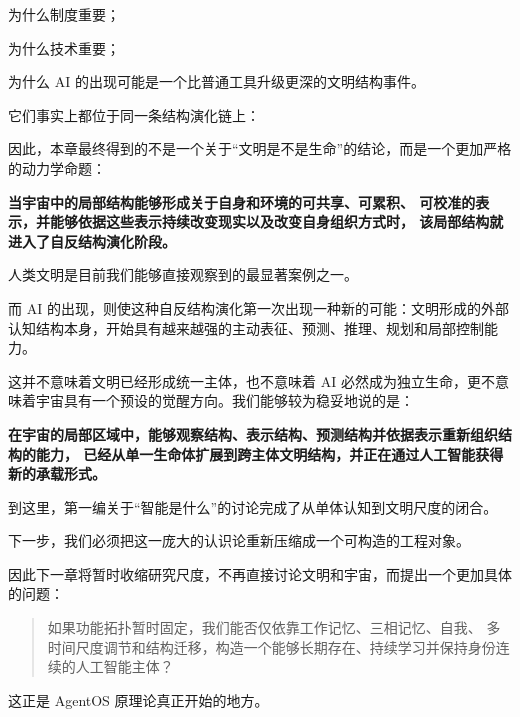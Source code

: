 为什么制度重要；

为什么技术重要；

为什么 AI 的出现可能是一个比普通工具升级更深的文明结构事件。

它们事实上都位于同一条结构演化链上：

\begin{statementbox}
\centering
{}
\end{statementbox}

因此，本章最终得到的不是一个关于“文明是不是生命”的结论，而是一个更加严格的动力学命题：

\begin{proposition*}
\bfseries
当宇宙中的局部结构能够形成关于自身和环境的可共享、可累积、
可校准的表示，并能够依据这些表示持续改变现实以及改变自身组织方式时，
该局部结构就进入了自反结构演化阶段。
\end{proposition*}

人类文明是目前我们能够直接观察到的最显著案例之一。

而 AI 的出现，则使这种自反结构演化第一次出现一种新的可能：文明形成的外部认知结构本身，开始具有越来越强的主动表征、预测、推理、规划和局部控制能力。

这并不意味着文明已经形成统一主体，也不意味着 AI 必然成为独立生命，更不意味着宇宙具有一个预设的觉醒方向。我们能够较为稳妥地说的是：

\begin{statementbox}
\bfseries
在宇宙的局部区域中，能够观察结构、表示结构、预测结构并依据表示重新组织结构的能力，
已经从单一生命体扩展到跨主体文明结构，并正在通过人工智能获得新的承载形式。
\end{statementbox}

到这里，第一编关于“智能是什么”的讨论完成了从单体认知到文明尺度的闭合。

下一步，我们必须把这一庞大的认识论重新压缩成一个可构造的工程对象。

因此下一章将暂时收缩研究尺度，不再直接讨论文明和宇宙，而提出一个更加具体的问题：

\begin{quote}
如果功能拓扑暂时固定，我们能否仅依靠工作记忆、三相记忆、自我、
多时间尺度调节和结构迁移，构造一个能够长期存在、持续学习并保持身份连续的人工智能主体？
\end{quote}

这正是 AgentOS 原理论真正开始的地方。

